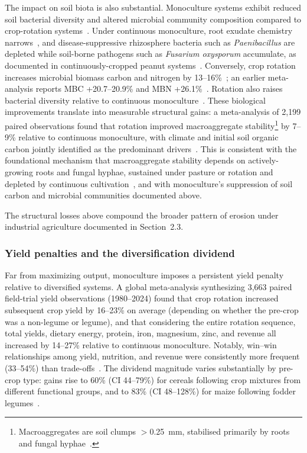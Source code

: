 The impact on soil biota is also substantial. Monoculture systems exhibit reduced soil bacterial diversity and altered microbial community composition compared to crop-rotation systems~\cite[Abstract,~Fig.~2]{li2025rotation}. Under continuous monoculture, root exudate chemistry narrows~\cite[Fig.~3C]{li2022chemodiversity}, and disease-suppressive rhizosphere bacteria such as \textit{Paenibacillus} are depleted while soil-borne pathogens such as \textit{Fusarium oxysporum} accumulate, as documented in continuously-cropped peanut systems~\cite[Figs.~2f,~4e]{zhou2023rotation}. Conversely, crop rotation increases microbial biomass carbon and nitrogen by 13--16\%~\cite[Section~3.2]{liu2023rotation}; an earlier meta-analysis reports MBC +20.7--20.9\% and MBN +26.1\%~\cite[Fig.~2]{mcdaniel2014diversity}. Rotation also raises bacterial diversity relative to continuous monoculture~\cite[Section~3.3]{liu2023rotation}\cite[Abstract,~Fig.~2]{li2025rotation}. These biological improvements translate into measurable structural gains: a meta-analysis of 2,199 paired observations found that rotation improved macroaggregate stability\footnote{Macroaggregates are soil clumps $>$0.25~mm, stabilised primarily by roots and fungal hyphae~\cite[pp.~141,~152,~155]{tisdall1982aggregation}.} by 7--9\% relative to continuous monoculture, with climate and initial soil organic carbon jointly identified as the predominant drivers~\cite[Table~1,~Section~3.5]{zheng2023aggregation}. This is consistent with the foundational mechanism that macroaggregate stability depends on actively-growing roots and fungal hyphae, sustained under pasture or rotation and depleted by continuous cultivation~\cite[pp.~143,~158]{tisdall1982aggregation}, and with monoculture's suppression of soil carbon and microbial communities documented above.


The structural losses above compound the broader pattern of erosion under industrial agriculture documented in Section~2.3.

\subsubsection{Yield penalties and the diversification dividend}

Far from maximizing output, monoculture imposes a persistent yield penalty relative to diversified systems. A global meta-analysis synthesizing 3,663 paired field-trial yield observations (1980--2024) found that crop rotation increased subsequent crop yield by 16--23\% on average (depending on whether the pre-crop was a non-legume or legume), and that considering the entire rotation sequence, total yields, dietary energy, protein, iron, magnesium, zinc, and revenue all increased by 14--27\% relative to continuous monoculture. Notably, win--win relationships among yield, nutrition, and revenue were consistently more frequent (33--54\%) than trade-offs~\cite[Abstract,~Fig.~1c,~Fig.~3]{mudare2025rotations}. The dividend magnitude varies substantially by pre-crop type: gains rise to 60\% (CI 44--79\%) for cereals following crop mixtures from different functional groups, and to 83\% (CI 48--128\%) for maize following fodder legumes~\cite[Fig.~2]{mudare2025rotations}.

